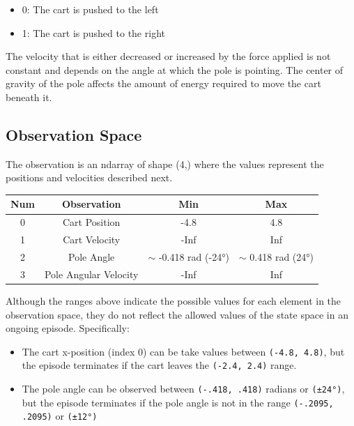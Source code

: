 \documentclass{article} %
\begin{document}
\begin{itemize}
    \item 0: The cart is pushed to the left
    \item 1: The cart is pushed to the right
\end{itemize}

The velocity that is either decreased or increased by the force applied is not constant
and depends on the angle at which the pole is pointing. The center of gravity of the pole
affects the amount of energy required to move the cart beneath it.

\subsection{Observation Space}

The observation is an ndarray of shape (4,) where the values represent the positions and
velocities described next.

\begin{center}
    \begin{tabular}{cccc}
        \toprule
        Num & Observation & Min & Max \\
        \midrule
        0 & Cart Position & -4.8 & 4.8 \\
        1 & Cart Velocity & -Inf & Inf \\
        2 & Pole Angle & $\sim$ -0.418 rad (-24°) & $\sim$ 0.418 rad (24°) \\
        3 & Pole Angular Velocity & -Inf & Inf \\
        \bottomrule
    \end{tabular}
\end{center}

Although the ranges above indicate the possible values for each element in the observation
space, they do not reflect the allowed values of the state space in an ongoing episode.
Specifically:

\begin{itemize}
    \item The cart x-position (index 0) can be take values between \verb|(-4.8, 4.8)|,
    but the episode terminates if the cart leaves the \verb|(-2.4, 2.4)| range.
    \item The pole angle can be observed between \verb|(-.418, .418)| radians
    or \verb|(±24°)|, but the
    episode terminates if the pole angle is not in the range \verb|(-.2095, .2095)|
    or \verb|(±12°)|
\end{itemize}
\end{document}
